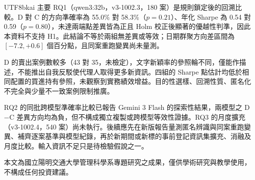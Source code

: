 \documentclass[12pt,a4paper]{article}
\newcommand{\grp}[1]{\textsf{#1}}
\begin{document}
\begin{CJK}{UTF8}{bkai}
主要 RQ1（qwen3:32b，v3-1002.3，180 案）是規則鎖定後的回溯比較。\grp{D} 對 \grp{C} 的方向準確率為 55.0\% 對 58.3\%（$p=0.21$）、年化 Sharpe 為 0.54 對 0.59（$p=0.80$），未達兩端點差異皆為正且 Holm 校正後顯著的優越性判準，因此本資料不支持 H1。此結論不等於兩組無差異或等效；日期群聚方向差區間為 $[-7.2,+0.6]$ 個百分點，且同案重跑變異尚未量測。

\grp{D} 的賣出案例數較多（43 對 35，未檢定），文字新穎率的參照輪不同，僅能作描述，不能推出自我反駁使代理人取得更多新資訊。四組的 Sharpe 點估計均低於相同配置的買進持有參照，未觀察到實務績效增益。目的性選樣、回溯性質、匿名化不完全與少量不一致案例限制推廣。

RQ2 的同批跨模型準確率比較已報告 Gemini 3 Flash 的探索性結果，兩模型之 \grp{D}$-$\grp{C} 差異方向均為負，但不構成獨立複製或跨模型等效性證據。RQ3 的月度擴充（v3-1002.4，540 案）尚未執行。後續應先在新版報告量測匿名辨識與同案重跑變異、補齊逐案基準與模型紀錄，再於新期間或新標的事前登記資訊集擴充、消融及月度比較。輸入資訊不足只是待檢驗假說之一。

\vspace{0.8cm}
\noindent\small 本文為國立陽明交通大學管理科學系專題研究之成果，僅供學術研究與教學使用，不構成任何投資建議。
\normalsize

\clearpage



\clearpage
\end{CJK}
\end{document}
